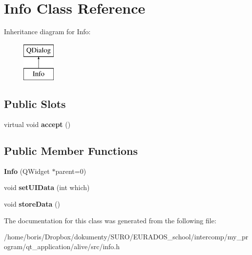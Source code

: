 \hypertarget{classInfo}{\section{Info Class Reference}
\label{classInfo}
}
Inheritance diagram for Info\-:\begin{figure}[H]
\begin{center}
\leavevmode
\includegraphics[height=2.000000cm]{classInfo}
\end{center}
\end{figure}
\subsection*{Public Slots}
\begin{DoxyCompactItemize}
\item 
\hypertarget{classInfo_af2626d1846ef58d75ff58a5dbade84ef}{virtual void {\bfseries accept} ()}\label{classInfo_af2626d1846ef58d75ff58a5dbade84ef}

\end{DoxyCompactItemize}
\subsection*{Public Member Functions}
\begin{DoxyCompactItemize}
\item 
\hypertarget{classInfo_abea2d82fa21531ecea0122a107ef183a}{{\bfseries Info} (Q\-Widget $\ast$parent=0)}\label{classInfo_abea2d82fa21531ecea0122a107ef183a}

\item 
\hypertarget{classInfo_a8c9adb529faf385cbcf753b38b5fa6fd}{void {\bfseries set\-U\-I\-Data} (int which)}\label{classInfo_a8c9adb529faf385cbcf753b38b5fa6fd}

\item 
\hypertarget{classInfo_a4198e1508cd99f933ff22ebee8578b82}{void {\bfseries store\-Data} ()}\label{classInfo_a4198e1508cd99f933ff22ebee8578b82}

\end{DoxyCompactItemize}


The documentation for this class was generated from the following file\-:\begin{DoxyCompactItemize}
\item 
/home/boris/\-Dropbox/dokumenty/\-S\-U\-R\-O/\-E\-U\-R\-A\-D\-O\-S\-\_\-school/intercomp/my\-\_\-program/qt\-\_\-application/alive/src/info.\-h\end{DoxyCompactItemize}
